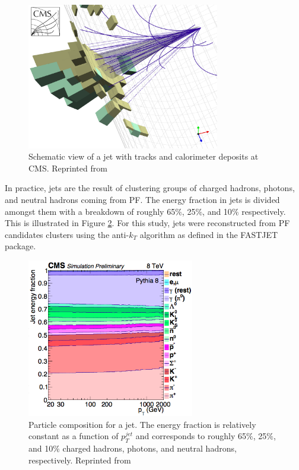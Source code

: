 \begin{figure}[h]
  	\label{fig:jets2}
 	\centering
 	\includegraphics[width=0.75\textwidth]{figures/cmsjet.png}
 	\singlespace
 	\caption{Schematic view of a jet with tracks and calorimeter deposits at CMS. Reprinted from \cite{jetCMS}}
 \end{figure}

In practice, jets are the result of clustering groups of charged hadrons, photons, and neutral hadrons coming from PF. The energy fraction in jets is divided amongst them with a breakdown of roughly 65$\%$, 25$\%$, and 10$\%$ respectively. This is illustrated in Figure \ref{fig:jme}. For this study, jets were reconstructed from PF candidates clusters using the anti-$k_{T}$ algorithm\cite{Cacciari:2008gp} as defined in the FASTJET package\cite{Cacciari:2011ma}.

\begin{figure}[h]
  	\label{fig:jme}
 	\centering
 	\includegraphics[width=0.65\textwidth]{figures/jme.png}
 	\singlespace
 	\caption{Particle composition for a jet. The energy fraction is relatively constant as a function of $p_{T}^{jet}$ and corresponds to roughly 65$\%$, 25$\%$, and 10$\%$ charged hadrons, photons, and neutral hadrons, respectively. Reprinted from \cite{Cacciari:2008gp}}
 \end{figure}

